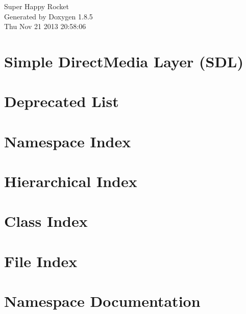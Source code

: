 \documentclass[twoside]{book}
\newcommand{\clearemptydoublepage}{%
  \newpage{\pagestyle{empty}\cleardoublepage}%
}
\begin{document}
\hypersetup{pageanchor=false}
\begin{titlepage}
\vspace*{7cm}
\begin{center}%
{\Large Super Happy Rocket }\\
\vspace*{1cm}
{\large Generated by Doxygen 1.8.5}\\
\vspace*{0.5cm}
{\small Thu Nov 21 2013 20:58:06}\\
\end{center}
\end{titlepage}
\clearemptydoublepage
\tableofcontents
\clearemptydoublepage
{}
\hypersetup{pageanchor=true}

\chapter{Simple Direct\-Media Layer (S\-D\-L)}
\label{index}\hypertarget{index}{}
\chapter{Deprecated List}
\label{deprecated}
\hypertarget{deprecated}{}

\chapter{Namespace Index}

\chapter{Hierarchical Index}

\chapter{Class Index}

\chapter{File Index}

\chapter{Namespace Documentation}

\end{document}

